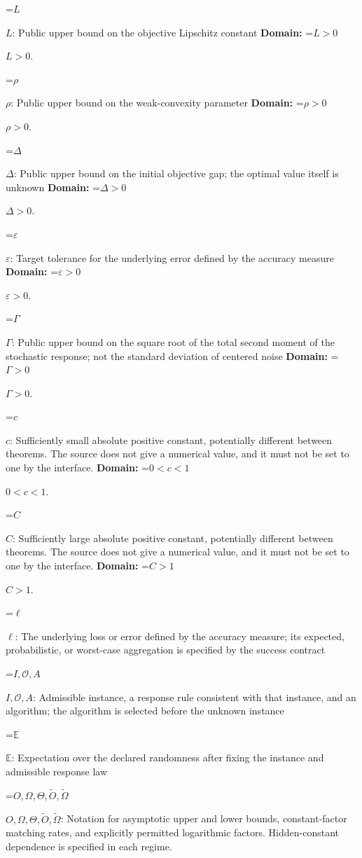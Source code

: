 \documentclass[10pt,a4paper]{article}
\newcommand{\AtlasMath}[1]{\par\begingroup\centering\setbox0=\hbox{$\displaystyle #1$}\ifdim\wd0>1.4\linewidth\typeout{ATLAS WIDE FORMULA: \the\wd0}\fi\ifdim\wd0>\linewidth\resizebox{\linewidth}{!}{\box0}\else\box0\fi\par\endgroup}
\newcommand{\AtlasInlineMath}[1]{\begingroup\setbox0=\hbox{$#1$}\ifdim\wd0>.4\linewidth\endgroup\AtlasMath{#1}\else\endgroup$#1$\fi}
\begin{document}
\AtlasInlineMath{L}: Public upper bound on the objective Lipschitz constant \textbf{Domain:} \AtlasInlineMath{L>0}.

\AtlasInlineMath{\rho}: Public upper bound on the weak-convexity parameter \textbf{Domain:} \AtlasInlineMath{\rho>0}.

\AtlasInlineMath{\Delta}: Public upper bound on the initial objective gap; the optimal value itself is unknown \textbf{Domain:} \AtlasInlineMath{\Delta>0}.

\AtlasInlineMath{\varepsilon}: Target tolerance for the underlying error defined by the accuracy measure \textbf{Domain:} \AtlasInlineMath{\varepsilon>0}.

\AtlasInlineMath{\Gamma}: Public upper bound on the square root of the total second moment of the stochastic response; not the standard deviation of centered noise \textbf{Domain:} \AtlasInlineMath{\Gamma>0}.

\AtlasInlineMath{c}: Sufficiently small absolute positive constant, potentially different between theorems. The source does not give a numerical value, and it must not be set to one by the interface. \textbf{Domain:} \AtlasInlineMath{0<c<1}.

\AtlasInlineMath{C}: Sufficiently large absolute positive constant, potentially different between theorems. The source does not give a numerical value, and it must not be set to one by the interface. \textbf{Domain:} \AtlasInlineMath{C>1}.

\AtlasInlineMath{\ell}: The underlying loss or error defined by the accuracy measure; its expected, probabilistic, or worst-case aggregation is specified by the success contract

\AtlasInlineMath{I,\mathcal{O},A}: Admissible instance, a response rule consistent with that instance, and an algorithm; the algorithm is selected before the unknown instance

\AtlasInlineMath{\mathbb{E}}: Expectation over the declared randomness after fixing the instance and admissible response law

\AtlasInlineMath{O,\Omega,\Theta,\widetilde{O},\widetilde\Omega}: Notation for asymptotic upper and lower bounds, constant-factor matching rates, and explicitly permitted logarithmic factors. Hidden-constant dependence is specified in each regime.
\end{document}

